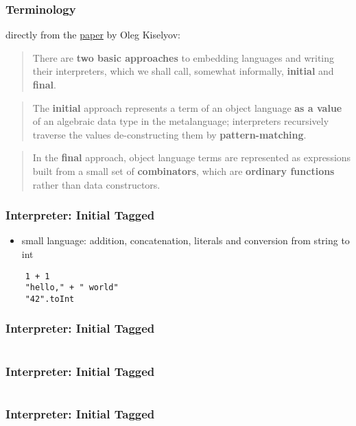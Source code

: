 \documentclass[aspectratio=169, hyperref={colorlinks, linkcolor=beamer@centricgreen}, urlcolor=links]{beamer}
\begin{document}
\begin{frame}
  \frametitle{Terminology}

  directly from the \href{http://okmij.org/ftp/tagless-final/course/lecture.pdf}{paper} by Oleg Kiselyov:
  \vfill
  \begin{quote}
    There are \textbf{two basic approaches} to embedding languages and
    writing their interpreters, which we shall call, somewhat
    informally, \textbf{initial} and \textbf{final}.
  \end{quote}
  \vfill
  \begin{quote}
    The \textbf{initial} approach represents a term of an object
    language \textbf{as a value} of an algebraic data type in the
    metalanguage; interpreters recursively traverse the values
    de-constructing them by \textbf{pattern-matching}.
  \end{quote}
  \vfill
  \begin{quote}
    In the \textbf{final} approach, object language terms are
    represented as expressions built from a small set of
    \textbf{combinators}, which are \textbf{ordinary functions} rather
    than data constructors.
  \end{quote}
\end{frame}

\begin{frame}[fragile]
  \frametitle{Interpreter: Initial Tagged}
  \begin{itemize}
  \item small language: addition, concatenation, literals and conversion from string to int
  \end{itemize}
  \begin{verbatim}
    1 + 1
    "hello," + " world"
    "42".toInt
  \end{verbatim}
\end{frame}

\begin{frame}[fragile]
  \frametitle{Interpreter: Initial Tagged}
  \inputminted[fontsize=\footnotesize]{scala}{snippets/initial-tagged-expr.scala}
\end{frame}

\begin{frame}[fragile]
  \frametitle{Interpreter: Initial Tagged}
  \inputminted[fontsize=\footnotesize]{scala}{snippets/initial-tagged-sample.scala}
\end{frame}

\begin{frame}[fragile]
  \frametitle{Interpreter: Initial Tagged}
  \inputminted[fontsize=\footnotesize]{scala}{snippets/initial-tagged-interp.scala}
\end{frame}
\end{document}
